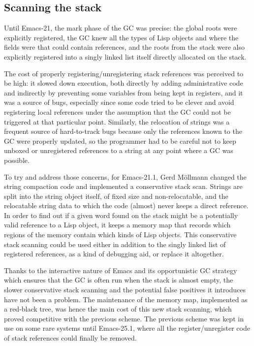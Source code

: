 \documentclass[format=acmsmall, review]{acmart}
\begin{document}
\subsection{Scanning the stack}
\label{sec:stack-scanning}

Until Emacs-21, the mark phase of the GC was precise: the global roots were
explicitly registered, the GC knew all the types of Lisp objects and where
the fields were that could contain references, and the roots from the stack
were also explicitly registered into a singly linked list itself directly
allocated on the stack.

The cost of properly registering/unregistering stack references was
perceived to be high: it slowed down execution, both directly by adding
administrative code and indirectly by preventing some variables from being
kept in registers, and it was a source of bugs, especially since some code
tried to be clever and avoid registering local references under the
assumption that the GC could not be triggered at that particular point.
Similarly, the relocation of strings was a frequent source of hard-to-track
bugs because only the references known to the GC were properly updated, so
the programmer had to be careful not to keep unboxed or unregistered
references to a string at any point where a GC was possible.

To try and address those concerns, for Emacs-21.1, Gerd Möllmann changed the
string compaction code and implemented a conservative stack scan.
Strings are split into the string object itself, of fixed size and
non-relocatable, and the relocatable string data to which the code (almost)
never keeps a direct reference.  In order to find out if a given word found
on the stack might be a potentially valid reference to a Lisp object, it
keeps a memory map that records which regions of the memory contain which
kinds of Lisp objects.  This conservative stack scanning could be used
either in addition to the singly linked list of registered references, as
a kind of debugging aid, or replace it altogether.

Thanks to the interactive nature of Emacs and its opportunistic GC strategy
which ensures that the GC is often run when the stack is almost empty, the
slower conservative stack scanning and the potential false positives it
introduces have not been a problem.  The maintenance of the memory map,
implemented as a red-black tree, was hence the main cost of this new stack
scanning, which proved competitive with the previous scheme.  The previous
scheme was kept in use on some rare systems until Emacs-25.1, where all the
register/unregister code of stack references could finally be removed.
\end{document}
